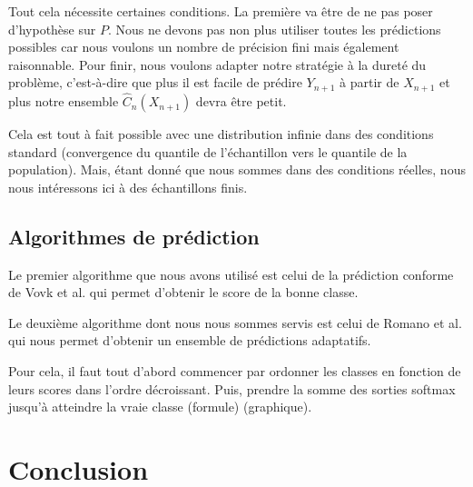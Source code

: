 \documentclass[a4paper,12pt]{article}
\begin{document}
\vspace{0.2cm}

Tout cela nécessite certaines conditions. La première va être de ne pas poser d'hypothèse sur $P$. Nous ne devons pas non plus utiliser toutes les prédictions possibles car nous voulons un nombre de précision fini mais également raisonnable. Pour finir, nous voulons adapter notre stratégie à la dureté du problème, c'est-à-dire que plus il est facile de prédire $Y_{n+1}$ à partir de $X_{n+1}$ et plus notre ensemble $\hat C_n(X_{n+1})$ devra être petit.

\vspace{0.2cm}

Cela est tout à fait possible avec une distribution infinie dans des conditions standard (convergence du quantile de l'échantillon vers le quantile de la population). Mais, étant donné que nous sommes dans des conditions réelles, nous nous intéressons ici à des échantillons finis.


\subsection{Algorithmes de prédiction}

Le premier algorithme que nous avons utilisé est celui de la prédiction conforme de Vovk et al.  qui permet d'obtenir le score de la bonne classe.

\vspace{0.2cm}

Le deuxième algorithme dont nous nous sommes servis est celui de Romano et al. qui nous permet d'obtenir un ensemble de prédictions adaptatifs. 

Pour cela, il faut tout d'abord commencer par ordonner les classes en fonction de leurs scores dans l'ordre décroissant. Puis, prendre la somme des sorties softmax jusqu'à atteindre la vraie classe (formule) (graphique).



\section{Conclusion}



\printbibliography
\end{document}
